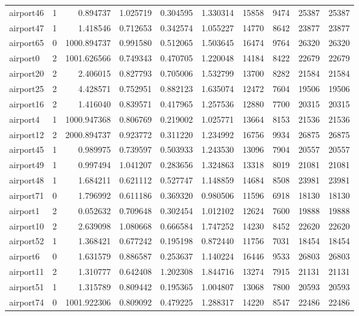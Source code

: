 \begin{longtable}{|l|r|r|r|r|r|r|r|r|r|}
airport46 & 1 & 0.894737 & 1.025719 & 0.304595 & 1.330314 & 15858 & 9474 & 25387 & 25387 \\
airport47 & 1 & 1.418546 & 0.712653 & 0.342574 & 1.055227 & 14770 & 8642 & 23877 & 23877 \\
airport65 & 0 & 1000.894737 & 0.991580 & 0.512065 & 1.503645 & 16474 & 9764 & 26320 & 26320 \\
airport0 & 2 & 1001.626566 & 0.749343 & 0.470705 & 1.220048 & 14184 & 8422 & 22679 & 22679 \\
airport20 & 2 & 2.406015 & 0.827793 & 0.705006 & 1.532799 & 13700 & 8282 & 21584 & 21584 \\
airport25 & 2 & 4.428571 & 0.752951 & 0.882123 & 1.635074 & 12472 & 7604 & 19506 & 19506 \\
airport16 & 2 & 1.416040 & 0.839571 & 0.417965 & 1.257536 & 12880 & 7700 & 20315 & 20315 \\
airport4 & 1 & 1000.947368 & 0.806769 & 0.219002 & 1.025771 & 13664 & 8153 & 21536 & 21536 \\
airport12 & 2 & 2000.894737 & 0.923772 & 0.311220 & 1.234992 & 16756 & 9934 & 26875 & 26875 \\
airport45 & 1 & 0.989975 & 0.739597 & 0.503933 & 1.243530 & 13096 & 7904 & 20557 & 20557 \\
airport49 & 1 & 0.997494 & 1.041207 & 0.283656 & 1.324863 & 13318 & 8019 & 21081 & 21081 \\
airport48 & 1 & 1.684211 & 0.621112 & 0.527747 & 1.148859 & 14684 & 8508 & 23981 & 23981 \\
airport71 & 0 & 1.796992 & 0.611186 & 0.369320 & 0.980506 & 11596 & 6918 & 18130 & 18130 \\
airport1 & 2 & 0.052632 & 0.709648 & 0.302454 & 1.012102 & 12624 & 7600 & 19888 & 19888 \\
airport10 & 2 & 2.639098 & 1.080668 & 0.666584 & 1.747252 & 14230 & 8452 & 22620 & 22620 \\
airport52 & 1 & 1.368421 & 0.677242 & 0.195198 & 0.872440 & 11756 & 7031 & 18454 & 18454 \\
airport6 & 0 & 1.631579 & 0.886587 & 0.253637 & 1.140224 & 16446 & 9533 & 26803 & 26803 \\
airport11 & 2 & 1.310777 & 0.642408 & 1.202308 & 1.844716 & 13274 & 7915 & 21131 & 21131 \\
airport51 & 1 & 1.315789 & 0.809442 & 0.195365 & 1.004807 & 13068 & 7800 & 20593 & 20593 \\
airport74 & 0 & 1001.922306 & 0.809092 & 0.479225 & 1.288317 & 14220 & 8547 & 22486 & 22486 \\

\end{longtable}
